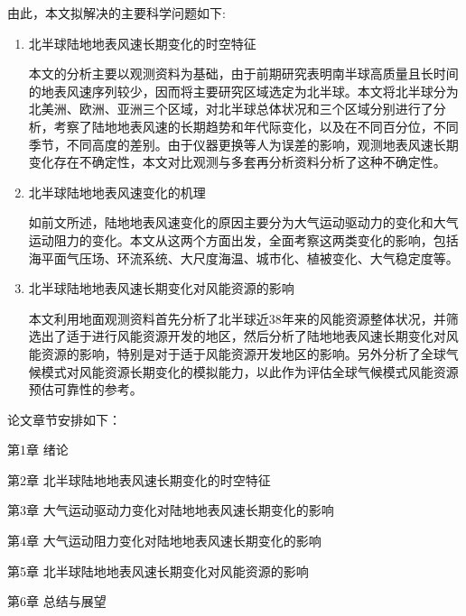 由此，本文拟解决的主要科学问题如下:

\begin{enumerate}
\item 北半球陆地地表风速长期变化的时空特征

本文的分析主要以观测资料为基础，由于前期研究表明南半球高质量且长时间的地表风速序列较少，因而将主要研究区域选定为北半球。本文将北半球分为北美洲、欧洲、亚洲三个区域，对北半球总体状况和三个区域分别进行了分析，考察了陆地地表风速的长期趋势和年代际变化，以及在不同百分位，不同季节，不同高度的差别。由于仪器更换等人为误差的影响，观测地表风速长期变化存在不确定性，本文对比观测与多套再分析资料分析了这种不确定性。

\item 北半球陆地地表风速变化的机理

如前文所述，陆地地表风速变化的原因主要分为大气运动驱动力的变化和大气运动阻力的变化。本文从这两个方面出发，全面考察这两类变化的影响，包括海平面气压场、环流系统、大尺度海温、城市化、植被变化、大气稳定度等。

\item 北半球陆地地表风速长期变化对风能资源的影响

本文利用地面观测资料首先分析了北半球近38年来的风能资源整体状况，并筛选出了适于进行风能资源开发的地区，然后分析了陆地地表风速长期变化对风能资源的影响，特别是对于适于风能资源开发地区的影响。另外分析了全球气候模式对风能资源长期变化的模拟能力，以此作为评估全球气候模式风能资源预估可靠性的参考。

\end{enumerate}

论文章节安排如下：

第1章	\quad 绪论

第2章	\quad 北半球陆地地表风速长期变化的时空特征

第3章	\quad 大气运动驱动力变化对陆地地表风速长期变化的影响

第4章	\quad 大气运动阻力变化对陆地地表风速长期变化的影响

第5章	\quad 北半球陆地地表风速长期变化对风能资源的影响

第6章	\quad 总结与展望
